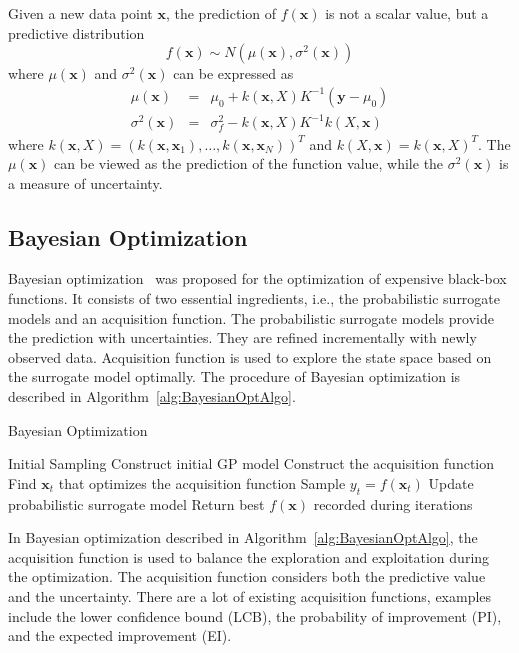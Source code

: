 Given a new data point $\bm{x}$, the prediction of $f(\bm{x})$ is
not a scalar value, but a predictive distribution 
\begin{equation}
f(\bm{x}) \sim N(\mu(\bm{x}),
\sigma^2(\bm{x}))
\label{eq:GPRPred}
\end{equation}
where $\mu(\bm{x})$ and $\sigma^2(\bm{x})$ can be expressed as
\begin{equation}
        \begin{array}{lll}
            \mu(\bm{x}) &=& \mu_0 + k(\bm{x},X)K^{-1}(\bm{y} - \mu_0) \\
            \sigma^2(\bm{x}) &=& \sigma_f^2 - k(\bm{x}, X)K^{-1}k(X, \bm{x})
        \end{array}
    \label{eq:GPRPredEqNoisy}
\end{equation}
where $k(\bm{x}, X) = (k(\bm{x}, \bm{x}_1), \dots, k(\bm{x},
\bm{x}_N))^T$ and $k(X, \bm{x}) = k(\bm{x}, X)^T$. The
$\mu(\bm{x})$ can be viewed as the prediction of the function value, while
the $\sigma^2(\bm{x})$ is a measure of uncertainty. 

\subsection{Bayesian Optimization}

Bayesian optimization~\cite{shahriari2016taking} was proposed for the
optimization of expensive black-box functions. It consists of two essential
ingredients, i.e., the probabilistic surrogate models and an acquisition
function. The probabilistic surrogate models provide the prediction with
uncertainties. They are refined incrementally with newly observed data.
Acquisition function is used to explore the state space based on the surrogate
model optimally. The procedure of Bayesian optimization is described in
Algorithm~\ref{alg:BayesianOptAlgo}.

\begin{algorithm}
\caption{Bayesian Optimization}
\label{alg:BayesianOptAlgo}
\begin{algorithmic}[1]
\STATE Initial Sampling
\STATE Construct initial GP model
\STATE Construct the acquisition function
\STATE Find $\bm{x}_t$ that optimizes the acquisition function
\STATE Sample $y_t = f(\bm{x}_t)$
\STATE Update probabilistic surrogate model
\ENDFOR
\STATE Return best $f(\bm{x})$ recorded during iterations
\end{algorithmic}
\end{algorithm}

In Bayesian optimization described in Algorithm~\ref{alg:BayesianOptAlgo}, the acquisition function is used to balance the exploration and exploitation during the optimization. The acquisition function considers both the predictive value and the uncertainty. There are a lot of existing acquisition functions, examples include the lower confidence bound (LCB), the probability of improvement (PI), and the expected improvement (EI).

